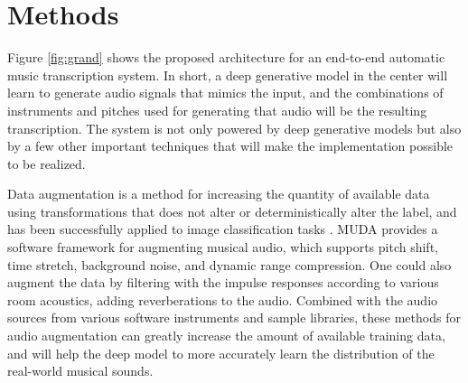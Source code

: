 
\graphicspath{{3-methods/figures/}}
\chapter{Methods}
\label{ch:methods}

Figure \ref{fig:grand} shows the proposed architecture for an end-to-end automatic music transcription system.
In short, a deep generative model in the center will learn to generate audio signals that mimics the input, and the combinations of instruments and pitches used for generating that audio will be the resulting transcription.
The system is not only powered by deep generative models but also by a few other important techniques that will make the implementation possible to be realized.

Data augmentation is a method for increasing the quantity of available data using transformations that does not alter or deterministically alter the label, and has been successfully applied to image classification tasks  \cite{krizhevsky2012imagenet}. MUDA \cite{mcfee2015muda} provides a software framework for augmenting musical audio, which supports pitch shift, time stretch, background noise, and dynamic range compression.
One could also augment the data by filtering with the impulse responses according to various room acoustics, adding reverberations to the audio.
Combined with the audio sources from various software instruments and sample libraries, these methods for audio augmentation can greatly increase the amount of available training data, and will help the deep model to more accurately learn the distribution of the real-world musical sounds.

